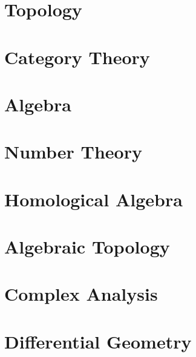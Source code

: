\documentclass{report}
\begin{document}
\chapter{Topology}
\renewcommand{\cat}{TO}


\chapter{Category Theory}
\renewcommand{\cat}{CT}






\chapter{Algebra}
\renewcommand{\cat}{AA}











\chapter{Number Theory}
\renewcommand{\cat}{NT}




\chapter{Homological Algebra}
\renewcommand{\cat}{HA}




\chapter{Algebraic Topology}
\renewcommand{\cat}{AT}


\chapter{Complex Analysis}
\renewcommand{\cat}{CA}


\chapter{Differential Geometry}
\renewcommand{\cat}{DG}




\end{document}

